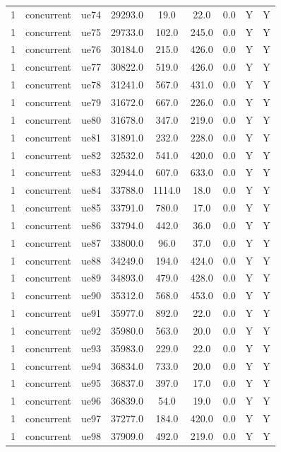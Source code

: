 \begin{table}[ht]
\begin{tabular}{|c|c|c|c|c|c|c|c|c|}
1 & concurrent & ue74 & 29293.0 & 19.0 & 22.0 & 0.0 & Y & Y \\
1 & concurrent & ue75 & 29733.0 & 102.0 & 245.0 & 0.0 & Y & Y \\
1 & concurrent & ue76 & 30184.0 & 215.0 & 426.0 & 0.0 & Y & Y \\
1 & concurrent & ue77 & 30822.0 & 519.0 & 426.0 & 0.0 & Y & Y \\
1 & concurrent & ue78 & 31241.0 & 567.0 & 431.0 & 0.0 & Y & Y \\
1 & concurrent & ue79 & 31672.0 & 667.0 & 226.0 & 0.0 & Y & Y \\
1 & concurrent & ue80 & 31678.0 & 347.0 & 219.0 & 0.0 & Y & Y \\
1 & concurrent & ue81 & 31891.0 & 232.0 & 228.0 & 0.0 & Y & Y \\
1 & concurrent & ue82 & 32532.0 & 541.0 & 420.0 & 0.0 & Y & Y \\
1 & concurrent & ue83 & 32944.0 & 607.0 & 633.0 & 0.0 & Y & Y \\
1 & concurrent & ue84 & 33788.0 & 1114.0 & 18.0 & 0.0 & Y & Y \\
1 & concurrent & ue85 & 33791.0 & 780.0 & 17.0 & 0.0 & Y & Y \\
1 & concurrent & ue86 & 33794.0 & 442.0 & 36.0 & 0.0 & Y & Y \\
1 & concurrent & ue87 & 33800.0 & 96.0 & 37.0 & 0.0 & Y & Y \\
1 & concurrent & ue88 & 34249.0 & 194.0 & 424.0 & 0.0 & Y & Y \\
1 & concurrent & ue89 & 34893.0 & 479.0 & 428.0 & 0.0 & Y & Y \\
1 & concurrent & ue90 & 35312.0 & 568.0 & 453.0 & 0.0 & Y & Y \\
1 & concurrent & ue91 & 35977.0 & 892.0 & 22.0 & 0.0 & Y & Y \\
1 & concurrent & ue92 & 35980.0 & 563.0 & 20.0 & 0.0 & Y & Y \\
1 & concurrent & ue93 & 35983.0 & 229.0 & 22.0 & 0.0 & Y & Y \\
1 & concurrent & ue94 & 36834.0 & 733.0 & 20.0 & 0.0 & Y & Y \\
1 & concurrent & ue95 & 36837.0 & 397.0 & 17.0 & 0.0 & Y & Y \\
1 & concurrent & ue96 & 36839.0 & 54.0 & 19.0 & 0.0 & Y & Y \\
1 & concurrent & ue97 & 37277.0 & 184.0 & 420.0 & 0.0 & Y & Y \\
1 & concurrent & ue98 & 37909.0 & 492.0 & 219.0 & 0.0 & Y & Y \\

\end{tabular}
\end{table}
